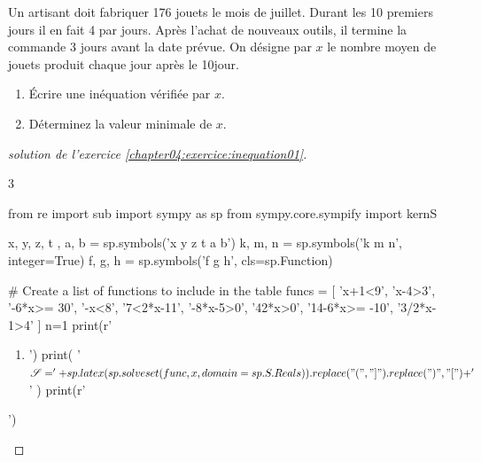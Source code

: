 \documentclass[main.tex]{subfiles}
\begin{document}
\newpage 
\begin{problem} Un artisant doit fabriquer 176 jouets le mois de juillet. Durant les 10 premiers jours il en fait 4 par jours. Après l'achat de nouveaux outils, il termine la commande 3 jours avant la date prévue. On désigne par $x$ le nombre moyen de jouets produit chaque jour après le 10\ieme jour. 
	\begin{enumerate}[leftmargin=*,label=\alph*)]
		\item Écrire une inéquation vérifiée par $x$.
		\item Déterminez la valeur minimale de $x$.
	\end{enumerate} 
	
\end{problem}
\begin{proof} [solution de l'exercice  \ref{chapter04:exercice:inequation01}]\hfill 
	\vspace{-0.75em}
\begin{multicols}{3} 
\begin{pycode}
from re import sub
import sympy as sp
from sympy.core.sympify import kernS

x, y, z, t , a, b = sp.symbols('x y z t a b')
k, m, n = sp.symbols('k m n', integer=True)
f, g, h = sp.symbols('f g h', cls=sp.Function)

# Create a list of functions to include in the table
funcs = [
'x+1<9',
'x-4>3', 
'-6*x>= 30',
'-x<8',
'7<2*x-11',
'-8*x-5>0',
'42*x>0',
'14-6*x>= -10',
'3/2*x-1>4'
]
n=1
print(r'\begin{enumerate}[label={$(I_{\arabic*})$}] ')
for func in funcs:
	print('\item ')
	print( '$\mathscr{S}  = ' + sp.latex(sp.solveset(func,   x,   domain=sp.S.Reals)).replace("(", "]").replace(")", "[")   + '$'     )
print(r'\end{enumerate}  ')
\end{pycode}
\end{multicols}	
\scriptsize
\end{proof} 
\vspace{-1em}
\end{document}
